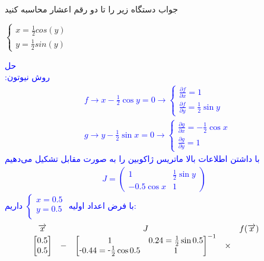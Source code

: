 \def\-{\raisebox{.75pt}{-}}

جواب دستگاه زیر را تا دو رقم اعشار محاسبه کنید
\begin{center}
$
    \begin{cases}
    x = \frac{1}{2} cos(y) \\
    y = \frac{1}{2} sin(y)
    \end{cases}
$
\end{center}

\textcolor{blue}{
حل 
\\
روش نیوتون:
\begin{align*}
    &f \rightarrow x - \frac{1}{2} \cos{y} = 0 \rightarrow \begin{cases}
        \frac{\partial f}{\partial x} = 1 \\
        \frac{\partial f}{\partial y} = \frac{1}{2} \sin{y}
    \end{cases}
    \\
    &g \rightarrow y - \frac{1}{2} \sin{x} = 0 \rightarrow 
    \begin{cases}
        \frac{\partial g}{\partial x} = -\frac{1}{2} \cos{x} \\
        \frac{\partial g}{\partial y} = 1
    \end{cases}
\end{align*}
با داشتن اطلاعات بالا ماتریس ژاکوبین را به صورت مقابل تشکیل می‌دهیم
\begin{align*}
    J = \begin{pmatrix}
        1 & \frac{1}{2} \sin{y} \\
        -0.5 \cos{x} & 1
    \end{pmatrix}
\end{align*}
با فرض اعداد اولیه 
$
\begin{cases}
    x = 0.5 \\
    y = 0.5 \\
\end{cases}$
داریم:
\begin{align*}
    &\begin{array}{ccccccc}
\overrightarrow{x} & & J & & f(\overrightarrow{x}) & \\
\begin{bmatrix}
    0.5 \\
    0.5
\end{bmatrix} & - & 
\begin{bmatrix}
    1 & 0.24 = \frac{1}{2} \sin{0.5} \\
    \-0.44 = \-\frac{1}{2} \cos{0.5} & 1
\end{bmatrix}^{-1} & \times &

\end{array}
\end{align*}}
